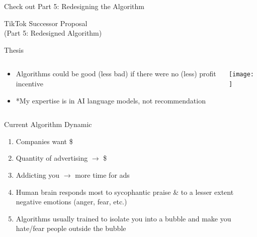 \documentclass[aspectratio=169]{beamer}
\begin{document}
\begin{frame}{Check out Part 5: Redesigning the Algorithm}
\end{frame}

\begin{frame}
    \centering
    \Huge TikTok Successor Proposal \\
    \Huge (Part 5: Redesigned Algorithm)
\end{frame}

\begin{frame}{Thesis}
\begin{columns}[T]
    \begin{column}[T]{0.5\textwidth}
        \begin{itemize}
            \item Algorithms could be good (less bad) if there were no (less) profit incentive
            \item *My expertise is in AI language models, not recommendation
        \end{itemize}
    \end{column}
    \begin{column}{0.5\textwidth}
        \texttt{[image: ]}
    \end{column}
\end{columns}
\end{frame}

\begin{frame}{Current Algorithm Dynamic}
\vspace{-0.6in}
\begin{enumerate}
    \item Companies want \$
    \item Quantity of advertising $\rightarrow$ \$
    \item Addicting you $\rightarrow$ more time for ads
    \item Human brain responds most to sycophantic praise \& to a lesser extent negative emotions (anger, fear, etc.)
    \item Algorithms usually trained to isolate you into a bubble and make you hate/fear people outside the bubble
\end{enumerate}
\end{frame}
\end{document}

